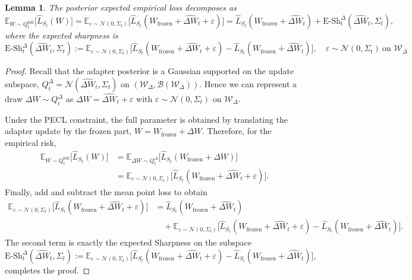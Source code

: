 \documentclass{article}
\theoremstyle{plain}
\newtheorem{lemma}[theorem]{Lemma}
\theoremstyle{definition}
\theoremstyle{remark}
\begin{document}
\begin{lemma}
    The posterior expected empirical loss decomposes as
\begin{equation*}
    \mathbb{E}_{W\sim Q_t^{\mathrm{full}}}\big[\hat{L}_{S_t}(W)\big]
= \mathbb{E}_{\varepsilon\sim\mathcal N(0,\Sigma_t)}
    \big[\hat{L}_{S_t}(W_\mathrm {frozen }+\hat{\Delta W}_t+\varepsilon)\big]
= \hat{L}_{S_t}(W_\mathrm {frozen }+\hat{\Delta W}_t)
  + \mathrm{E\text{-}Sh}_t^{\Delta}(\hat{\Delta W}_t,\Sigma_t),
\end{equation*}
where the expected sharpness is
$$
\mathrm{E\text{-}Sh}_t^{\Delta}(\hat{\Delta W}_t,\Sigma_t)
:= \mathbb{E}_{\varepsilon\sim\mathcal N(0,\Sigma_t)}
   \big[\hat{L}_{S_t}(W_\mathrm {frozen }+\hat{\Delta W}_t+\varepsilon)
       - \hat{L}_{S_t}(W_\mathrm {frozen }+\hat{\Delta W}_t)\big],\quad
\varepsilon\sim\mathcal N(0,\Sigma_t)\ \text{on } \mathcal W_\Delta$$
\end{lemma}


\begin{proof}
Recall that the adapter posterior is a Gaussian supported on the update subspace,
$
Q_t^\Delta = \mathcal N(\hat{\Delta W}_t,\Sigma_t)
$
on $(\mathcal W_\Delta,\mathcal B(\mathcal W_\Delta))$.
Hence we can represent a draw $\Delta W \sim Q_t^\Delta$ as
$
\Delta W = \hat{\Delta W}_t + \varepsilon
$
with $\varepsilon \sim \mathcal N(0,\Sigma_t)$ on $\mathcal W_\Delta$.

Under the PECL constraint, the full parameter is obtained by translating the adapter update by the frozen part,
$
W = W_{\mathrm{frozen}} + \Delta W.
$
Therefore, for the empirical risk,
\begin{align*}
\mathbb E_{W \sim Q_t^{\mathrm{full}}}\big[\hat L_{S_t}(W)\big]
&= \mathbb E_{\Delta W \sim Q_t^\Delta}\big[\hat L_{S_t}(W_{\mathrm{frozen}}+\Delta W)\big] \\
&= \mathbb E_{\varepsilon \sim \mathcal N(0,\Sigma_t)}
\big[\hat L_{S_t}(W_{\mathrm{frozen}}+\hat{\Delta W}_t+\varepsilon)\big].
\end{align*}
Finally, add and subtract the mean point loss to obtain
\begin{align*}
\mathbb E_{\varepsilon \sim \mathcal N(0,\Sigma_t)}
\big[\hat L_{S_t}(W_{\mathrm{frozen}}+\hat{\Delta W}_t+\varepsilon)\big]
&=
\hat L_{S_t}(W_{\mathrm{frozen}}+\hat{\Delta W}_t) \\
&\quad +
\mathbb E_{\varepsilon \sim \mathcal N(0,\Sigma_t)}
\Big[
\hat L_{S_t}(W_{\mathrm{frozen}}+\hat{\Delta W}_t+\varepsilon)
-
\hat L_{S_t}(W_{\mathrm{frozen}}+\hat{\Delta W}_t)
\Big].
\end{align*}
The second term is exactly the expected Sharpness on the subspace
\[
\mathrm{E\text{-}Sh}_t^\Delta(\hat{\Delta W}_t,\Sigma_t)
:=
\mathbb E_{\varepsilon \sim \mathcal N(0,\Sigma_t)}
\Big[
\hat L_{S_t}(W_{\mathrm{frozen}}+\hat{\Delta W}_t+\varepsilon)
-
\hat L_{S_t}(W_{\mathrm{frozen}}+\hat{\Delta W}_t)
\Big],
\]
completes the proof.
\end{proof}
\end{document}

